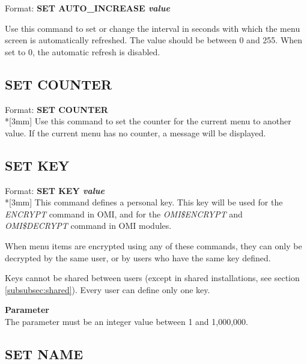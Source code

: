 \documentclass[a4paper]{book}
\newcommand{\vs}{\vspace{3mm}}
\renewcommand{\indent}{\hspace*{5mm}}
\begin{document}
\indent Format: \textbf{SET AUTO{\_}INCREASE \textit{value}}

\noindent Use this command to set or change the interval in seconds with which the 
menu screen is automatically refreshed. The value should be between 0 and 
255. When set to 0, the automatic refresh is disabled.

\subsection{SET COUNTER}
\label{subsubsec:mylabel75}

\indent Format: \textbf{SET COUNTER}\\*[3mm]
Use this command to set the counter for the current menu to another value. 
If the current menu has no counter, a message will be displayed.

\subsection{SET KEY}
\label{subsubsec:mylabel76}

\indent Format: \textbf{SET KEY \textit{value}}\\*[3mm]
This command defines a personal key. This key will be used for the 
\textsl{ENCRYPT} command in OMI, and for the 
\textsl{OMI{\$}ENCRYPT} and 
\textsl{OMI{\$}DECRYPT} command in OMI 
modules.

\vs

When menu items are encrypted using any of these commands, they can only be 
decrypted by the same user, or by users who have the same key defined.

Keys cannot be shared between users (except in shared installations, see 
section \ref{subsubsec:shared}). Every user can define only one key.

\noindent\textbf{Parameter}\\[3mm]
The parameter must be an integer value between 1 and 1,000,000.

\subsection{SET NAME}
\label{subsubsec:mylabel77}
\end{document}
